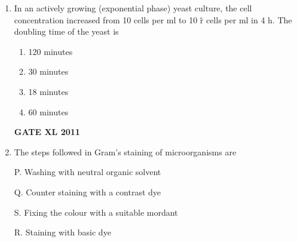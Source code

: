 \documentclass[journal,12pt,onecolumn]{IEEEtran}
\begin{document}
\begin{enumerate}
\begin{minipage}{0.5\textwidth}
\begin{flushleft}
		\end{flushleft}
		\end{minipage}
	\begin{minipage}{0.5\textwidth}
		\begin{flushleft}
1. Foam


2. Emulsion


3. Sol


4. Gel
		\end{flushleft}
		\end{minipage}

\begin{enumerate}
	\item P-2 Q-1, R-3.S-4
	\item P-4, Q3, R-2, S-1
	\item P-4, Q-2, R-3, S-1
	\item P-3, Q-4, R-1, S-2
\end{enumerate}
\hfill{\textbf{GATE XL 2011}}

\item{ In an actively growing (exponential phase) yeast culture, the cell concentration increased from 10 cells per ml to 10 \^ r cells per ml in 4 h. The doubling time of the yeast is}

\begin{enumerate}
	\item 120 minutes
	\item 30 minutes
	\item 18 minutes
	\item 60 minutes
\end{enumerate}
\hfill{\textbf{GATE XL 2011}}

\item{ The steps followed in Gram's staining of microorganisms are

P. Washing with neutral organic solvent

Q. Counter staining with a contrast dye

S. Fixing the colour with a suitable mordant

R. Staining with basic dye

}
\end{enumerate}
\end{document}

